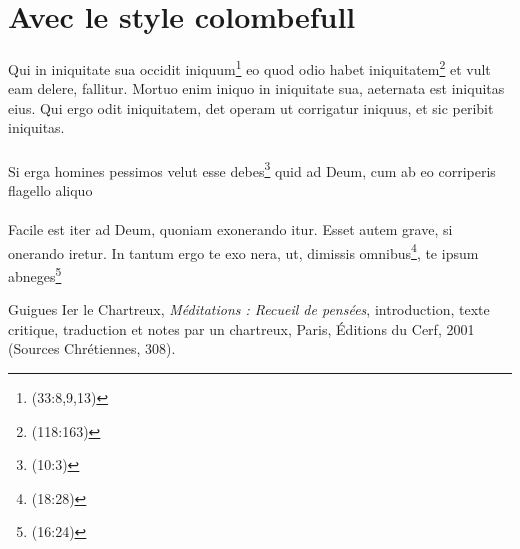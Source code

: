 \documentclass[12pt]{article}
\begin{document}
\section{Avec le style colombefull}
\paragraph{}
Qui in iniquitate sua occidit iniquum\footnote{
(33:8,9,13)}  eo quod odio habet iniquitatem\footnote{(118:163)
} et vult eam delere, fallitur. Mortuo enim iniquo in
iniquitate sua, aeternata est iniquitas eius. Qui ergo odit iniquitatem, det operam ut corrigatur iniquus, et sic peribit iniquitas.
\paragraph{}
Si erga homines pessimos velut esse debes\footnote{(10:3)} quid ad Deum, cum ab eo corriperis flagello aliquo
\paragraph{}
Facile est iter ad Deum, quoniam exonerando itur.
Esset autem grave, si onerando iretur. In tantum ergo te exo nera, ut, dimissis omnibus\footnote{(18:28)}, te ipsum abneges\footnote{(16:24)} \cite{guigues2001}

\newpage
\begin{thebibliography}{}

 Guigues Ier le Chartreux,  
\textit{Méditations : Recueil de pensées},  
introduction, texte critique, traduction et notes par un chartreux,  
Paris, Éditions du Cerf, 2001 (Sources Chrétiennes, 308).
\end{thebibliography}
\end{document}
